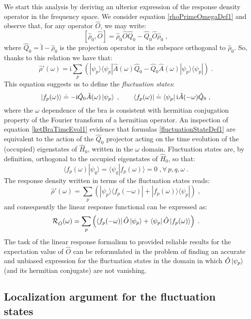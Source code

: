 \documentclass[a4paper]{article}
\newcommand{\ii}{\mathrm{i}}
\newcommand{\be}{\begin{equation}}
\newcommand{\ee}{\end{equation}}
\newcommand{\qq}{\qquad}
\newcommand{\lb}{\label}
\newcommand{\op}[1]{\hat {#1}}
\newcommand{\commutator}[2]{\left[ {#1} , {#2} \right]}
\newcommand{\brket}[2]{\langle  #1 | #2 \rangle} %
\newcommand{\ketbra}[2]{| #1 \rangle \langle #2 |}
\newcommand{\dmnot}{\op{\rho}_0}
\newcommand{\dm}{\op{\rho}}
\newcommand{\hnot}{\op{H}_0}
\newcommand{\identity}{\op{\mathbb I}}
\begin{document}
We start this analysis by deriving an ulterior expression of the response density operator in the frequency space. We consider equation \eqref{rhoPrimeOmegaDef1} and observe that, for any 
operator $\op O$, we may write:  
\be
\commutator{\dmnot}{\op O} = \dmnot \op O \op Q_0 - \op Q_0 \op O \dmnot\;,
\ee
where $\op Q_0= \identity - \dmnot$ is the projection operator in the subspace orthogonal to $\dmnot$. So, thanks to this relation we have that:
\be
\dm'(\omega) = \ii\sum_p\left(\ketbra{\psi_p}{\psi_p}\op A(\omega)\op Q_0 - \op Q_0\op A(\omega)\ketbra{\psi_p}{\psi_p}\right) \;.
\ee
This equation suggests us to define the \emph{fluctuation states}:
\be\lb{fluctuationStateDef1}
\ket{f_p(\omega)} \doteq -\ii\op Q_0\op A(\omega)\ket{\psi_p} \;, \qq
\bra{f_p(\omega)} \doteq \bra{\psi_p}\ii\op A(-\omega)\op Q_0 \;,
\ee
where the $\omega$ dependence of the bra is consistent with hermitian conjugation property of the Fourier transform of a hermitian operator. An inspection of equation \eqref{ketBraTimeEvol1} 
evidence that formulas \eqref{fluctuationStateDef1} are equivalent to the action of the $\op Q_0$ projector acting on the time evolution of the (occupied) eigenstates of $\hnot$, written 
in the $\omega$ domain. Fluctuation states are, by definition, orthogonal to the occupied eigenstates of $\hnot$, so that:
\be
\brket{f_p(\omega)}{\psi_q} = \brket{\psi_q}{f_p(\omega)} = 0 \;, \forall \, p,q,\omega \;.
\ee
The response density written in terms of the fluctuation states reads:
\be\lb{rhoPrimeFluctuationStateDef1}
\dm'(\omega) = \sum_p\left(\ketbra{\psi_p}{f_p(-\omega)} + \ketbra{f_p(\omega)}{\psi_p}\right) \;,
\ee
and consequently the linear response functional can be expressed as:
\be\lb{LinearResponseFunctDef2}
{\cal R}_{\op O}(\omega) = 
\sum_p\left(\bra{f_p(-\omega)}\op O\ket{\psi_p} + \bra{\psi_p}\op O\ket{f_p(\omega)}\right) \;.
\ee
The task of the linear response formalism to provided reliable results for the expectation value of $\op O$ can be reformulated in the problem of finding an accurate and unbiased
expression for the fluctuation states in the domain in which $\op O\ket{\psi_p}$ (and its hermitian conjugate) are not vanishing. 

\subsection{Localization argument for the fluctuation states}
\lb{LocalizationFluctuationStates}
\end{document}
